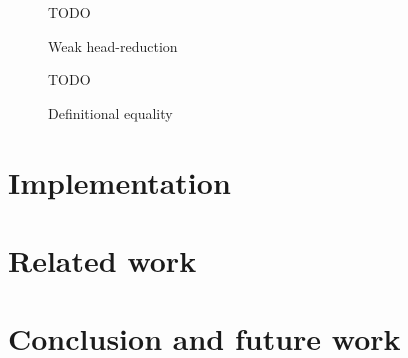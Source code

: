\documentclass[9pt]{sigplanconf}
\begin{document}
\begin{figure*}
  \centering
  TODO
  \caption{Weak head-reduction}
  \label{fig:whr}
\end{figure*}

\begin{figure*}
  \centering
  TODO
  \caption{Definitional equality}
  \label{fig:def-eq}
\end{figure*}

\section{Implementation}

\section{Related work}

\section*{Conclusion and future work}






\end{document}
